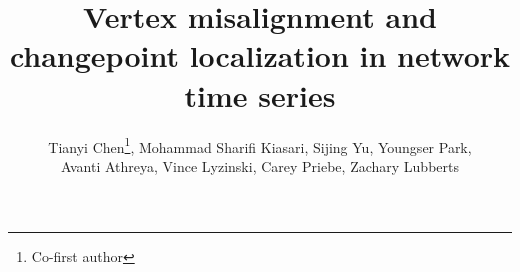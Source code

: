 \documentclass[12pt]{article}
\theoremstyle{definition}
\begin{document}
\title{Vertex misalignment and changepoint localization in network time series}

\author{Tianyi Chen\footnote{Co-first author}, Mohammad Sharifi Kiasari\footnotemark[1], Sijing Yu, Youngser Park, \\ Avanti Athreya, Vince Lyzinski, Carey Priebe, Zachary Lubberts}


\date{}

\maketitle
\end{document}
